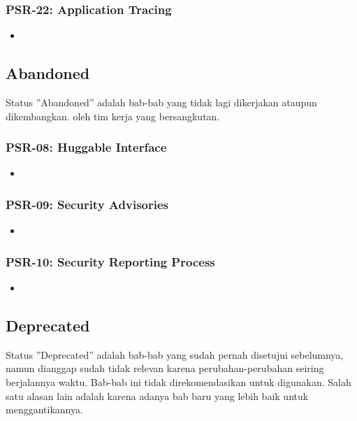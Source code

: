 \subsubsection{PSR-22: Application Tracing}
\label{subsubsec:psr22}
\begin{itemize}
	\item
\end{itemize}


\subsection{Abandoned}
\label{subsec:abandoned}
Status ''Abandoned'' adalah bab-bab yang tidak lagi dikerjakan ataupun dikembangkan. oleh tim kerja yang bersangkutan. 

\subsubsection{PSR-08: Huggable Interface}
\label{subsubsec:psr08}
\begin{itemize}
	\item
\end{itemize}

\subsubsection{PSR-09: Security Advisories}
\label{subsubsec:psr09}
\begin{itemize}
	\item
\end{itemize}

\subsubsection{PSR-10: Security Reporting Process}
\label{subsubsec:psr10}
\begin{itemize}
	\item
\end{itemize}


\subsection{Deprecated}
\label{subsec:deprecated}
Status ''Deprecated'' adalah bab-bab yang sudah pernah disetujui sebelumnya, namun dianggap sudah tidak relevan karena perubahan-perubahan seiring berjalannya waktu. Bab-bab ini tidak direkomendasikan untuk digunakan. Salah satu alasan lain adalah karena adanya bab baru yang lebih baik untuk menggantikannya.

